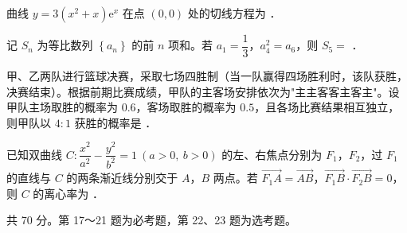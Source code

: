 \begin{question}
曲线 $y=3\left(x^{2}+x\right)\mathrm e^{x}$ 在点 $(0,0)$ 处的切线方程为 \gkblank{}．

\end{question}
\begin{question}
记 $S_n$ 为等比数列 $\left\{a_n\right\}$ 的前 $n$ 项和。若 $a_1=\dfrac13$，$a_4^{2}=a_6$，则 $S_5=$ \gkblank{}．

\end{question}
\begin{question}
甲、乙两队进行篮球决赛，采取七场四胜制（当一队赢得四场胜利时，该队获胜，决赛结束）。根据前期比赛成绩，甲队的主客场安排依次为"主主客客主客主"。设甲队主场取胜的概率为 $0.6$，客场取胜的概率为 $0.5$，且各场比赛结果相互独立，则甲队以 $4:1$ 获胜的概率是 \gkblank{}．

\end{question}
\begin{question}
已知双曲线 $C:\dfrac{x^{2}}{a^{2}}-\dfrac{y^{2}}{b^{2}}=1\ (a>0,\ b>0)$ 的左、右焦点分别为 $F_1$，$F_2$，过 $F_1$ 的直线与 $C$ 的两条渐近线分别交于 $A$，$B$ 两点。若 $\overrightarrow{F_1A}=\overrightarrow{AB}$，$\overrightarrow{F_1B}\cdot\overrightarrow{F_2B}=0$，则 $C$ 的离心率为 \gkblank{}．

\par\medskip

\end{question}

\begin{gktip}
共 70 分。第 17～21 题为必考题，第 22、23 题为选考题。
\end{gktip}


